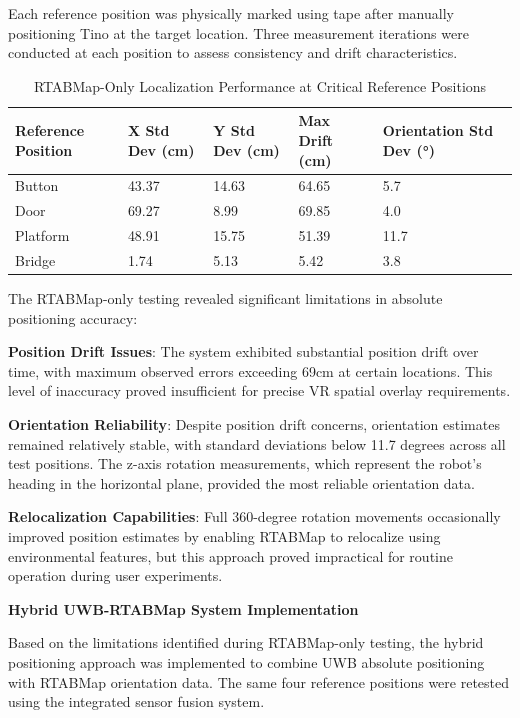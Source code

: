 Each reference position was physically marked using tape after manually positioning Tino at the target location. Three measurement iterations were conducted at each position to assess consistency and drift characteristics.

\begin{table}[H]
    \centering
    \footnotesize
    \begin{tabular}{|p{4cm}|p{2.5cm}|p{2.5cm}|p{2.5cm}|p{2.5cm}|}
        \hline
        \textbf{Reference Position} & \textbf{X Std Dev (cm)} & \textbf{Y Std Dev (cm)} & \textbf{Max Drift (cm)} & \textbf{Orientation Std Dev (°)} \\ 
        \hline
        Button & 43.37 & 14.63 & 64.65 & 5.7 \\
        Door & 69.27 & 8.99 & 69.85 & 4.0 \\
        Platform & 48.91 & 15.75 & 51.39 & 11.7 \\
        Bridge & 1.74 & 5.13 & 5.42 & 3.8 \\
        \hline
    \end{tabular}
    \caption{RTABMap-Only Localization Performance at Critical Reference Positions}
    \label{tab:rtabmap_baseline}
\end{table}

The RTABMap-only testing revealed significant limitations in absolute positioning accuracy:

\textbf{Position Drift Issues}: The system exhibited substantial position drift over time, with maximum observed errors exceeding 69cm at certain locations. This level of inaccuracy proved insufficient for precise VR spatial overlay requirements.

\textbf{Orientation Reliability}: Despite position drift concerns, orientation estimates remained relatively stable, with standard deviations below 11.7 degrees across all test positions. The z-axis rotation measurements, which represent the robot's heading in the horizontal plane, provided the most reliable orientation data.

\textbf{Relocalization Capabilities}: Full 360-degree rotation movements occasionally improved position estimates by enabling RTABMap to relocalize using environmental features, but this approach proved impractical for routine operation during user experiments.

\textbf{Hybrid UWB-RTABMap System Implementation}

Based on the limitations identified during RTABMap-only testing, the hybrid positioning approach was implemented to combine UWB absolute positioning with RTABMap orientation data. The same four reference positions were retested using the integrated sensor fusion system.

